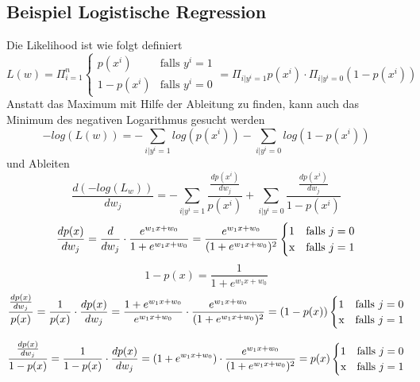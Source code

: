 \documentclass{report}
\begin{document}
\subsection{Beispiel Logistische Regression}
Die Likelihood ist wie folgt definiert
\begin{equation*}
L(w) = \Pi_{i=1}^n 
\begin{cases}
  p(x^i) & \text{falls $y^i = 1$}\\
  1 - p(x^i) & \text{falls $y^i = 0$}
\end{cases} = \Pi_{i | y^i=1}p(x^i) \cdot \Pi_{i | y^i = 0}(1 - p(x^i))
\end{equation*}
Anstatt das Maximum mit Hilfe der Ableitung zu finden, kann auch das Minimum des negativen Logarithmus gesucht werden
\begin{equation*}
  -log(L(w)) = -\sum_{i|y^i = 1}log(p(x^i)) - \sum_{i | y^i = 0}log(1 - p(x^i))
\end{equation*}
und Ableiten
$$\frac{d(-log(L_w))}{dw_j} = - \sum_{i|y^i = 1} \frac{\frac{dp(x^i)}{dw_j}}{p(x^i)} + \sum_{i|y^i = 0} \frac{\frac{dp(x^i)}{dw_j}}{1 - p(x^i)}$$
\begin{equation*}
  \frac{dp(x)}{dw_j} = \frac{d}{dw_j}\cdot \frac{e^{w_1x + w_0}}{1 + e^{w_1x + w_0}} = \frac{e^{w_1x + w_0}}{(1 + e^{w_1x + w_0})^2}
  \begin{cases}
    1 & \text{falls $j = 0$}\\
    $x$ & \text{falls $j = 1$}
  \end{cases}
\end{equation*}
$$1 - p(x) = \frac{1}{1 + e^{w_1x + w_0}}$$
\begin{equation*}
  \frac{\frac{dp(x)}{dw_j}}{p(x)} = \frac{1}{p(x)}\cdot \frac{dp(x)}{dw_j} = 
  \frac{1 + e^{w_1x + w_0}}{e^{w_1x + w_0}}\cdot \frac{e^{w_1x + w_0}}{(1 + e^{w_1x + w_0})^2} = (1 - p(x))
  \begin{cases}
    1 & \text{falls $j = 0$}\\
    $x$ & \text{falls $j = 1$}
  \end{cases}
\end{equation*}

\begin{equation*}
  \frac{\frac{dp(x)}{dw_j}}{1 - p(x)} = \frac{1}{1 - p(x)}\cdot \frac{dp(x)}{dw_j}
  = (1 + e^{w_1x + w_0})\cdot \frac{e^{w_1x + w_0}}{(1 + e^{w_1x + w_0})^2} = p(x)
  \begin{cases}
    1 & \text{falls $j = 0$}\\
    $x$ & \text{falls $j = 1$}
  \end{cases}
\end{equation*}
\end{document}
